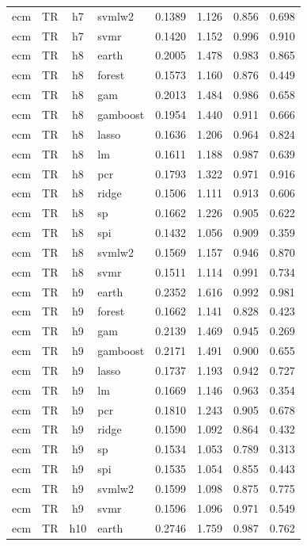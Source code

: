 \begin{ThreePartTable}
\begin{longtable}[t]{llclcccc}
ecm & TR & h7 & svmlw2 & 0.1389 & 1.126 & 0.856 & 0.698\\
ecm & TR & h7 & svmr & 0.1420 & 1.152 & 0.996 & 0.910\\
\addlinespace
ecm & TR & h8 & earth & 0.2005 & 1.478 & 0.983 & 0.865\\
ecm & TR & h8 & forest & 0.1573 & 1.160 & 0.876 & 0.449\\
ecm & TR & h8 & gam & 0.2013 & 1.484 & 0.986 & 0.658\\
ecm & TR & h8 & gamboost & 0.1954 & 1.440 & 0.911 & 0.666\\
ecm & TR & h8 & lasso & 0.1636 & 1.206 & 0.964 & 0.824\\
ecm & TR & h8 & lm & 0.1611 & 1.188 & 0.987 & 0.639\\
ecm & TR & h8 & pcr & 0.1793 & 1.322 & 0.971 & 0.916\\
ecm & TR & h8 & ridge & 0.1506 & 1.111 & 0.913 & 0.606\\
ecm & TR & h8 & sp & 0.1662 & 1.226 & 0.905 & 0.622\\
ecm & TR & h8 & spi & 0.1432 & 1.056 & 0.909 & 0.359\\
ecm & TR & h8 & svmlw2 & 0.1569 & 1.157 & 0.946 & 0.870\\
ecm & TR & h8 & svmr & 0.1511 & 1.114 & 0.991 & 0.734\\
\addlinespace
ecm & TR & h9 & earth & 0.2352 & 1.616 & 0.992 & 0.981\\
ecm & TR & h9 & forest & 0.1662 & 1.141 & 0.828 & 0.423\\
ecm & TR & h9 & gam & 0.2139 & 1.469 & 0.945 & 0.269\\
ecm & TR & h9 & gamboost & 0.2171 & 1.491 & 0.900 & 0.655\\
ecm & TR & h9 & lasso & 0.1737 & 1.193 & 0.942 & 0.727\\
ecm & TR & h9 & lm & 0.1669 & 1.146 & 0.963 & 0.354\\
ecm & TR & h9 & pcr & 0.1810 & 1.243 & 0.905 & 0.678\\
ecm & TR & h9 & ridge & 0.1590 & 1.092 & 0.864 & 0.432\\
ecm & TR & h9 & sp & 0.1534 & 1.053 & 0.789 & 0.313\\
ecm & TR & h9 & spi & 0.1535 & 1.054 & 0.855 & 0.443\\
ecm & TR & h9 & svmlw2 & 0.1599 & 1.098 & 0.875 & 0.775\\
ecm & TR & h9 & svmr & 0.1596 & 1.096 & 0.971 & 0.549\\
\addlinespace
ecm & TR & h10 & earth & 0.2746 & 1.759 & 0.987 & 0.762\\

\end{longtable}
\end{ThreePartTable}
